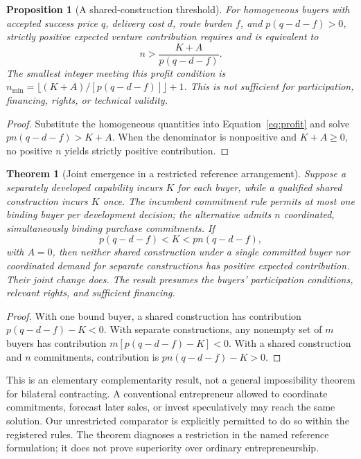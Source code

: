 \documentclass[11pt,letterpaper]{article}
\newtheorem{proposition}{Proposition}[section]
\newtheorem{theorem}{Theorem}[section]
\theoremstyle{remark}\newtheorem{remark}{Remark}[section]
\begin{document}
\begin{proposition}[A shared-construction threshold]\label{prop:threshold}
For homogeneous buyers with accepted success price $q$, delivery cost $d$, route burden $f$, and $p(q-d-f)>0$, strictly positive expected venture contribution requires and is equivalent to
\begin{equation}\label{eq:nmin}
n>\frac{K+A}{p(q-d-f)}.
\end{equation}
The smallest integer meeting this profit condition is
$n_{\min}=\lfloor(K+A)/[p(q-d-f)]\rfloor+1$.
This is not sufficient for participation, financing, rights, or technical validity.
\end{proposition}
\begin{proof}
Substitute the homogeneous quantities into Equation~\eqref{eq:profit} and solve $pn(q-d-f)>K+A$. When the denominator is nonpositive and $K+A\ge0$, no positive $n$ yields strictly positive contribution.
\end{proof}

\begin{theorem}[Joint emergence in a restricted reference arrangement]\label{thm:joint}
Suppose a separately developed capability incurs $K$ for each buyer, while a qualified shared construction incurs $K$ once. The incumbent commitment rule permits at most one binding buyer per development decision; the alternative admits $n$ coordinated, simultaneously binding purchase commitments. If
\begin{equation}\label{eq:joint}
p(q-d-f)<K<pn(q-d-f),
\end{equation}
with $A=0$, then neither shared construction under a single committed buyer nor coordinated demand for separate constructions has positive expected contribution. Their joint change does. The result presumes the buyers' participation conditions, relevant rights, and sufficient financing.
\end{theorem}
\begin{proof}
With one bound buyer, a shared construction has contribution $p(q-d-f)-K<0$. With separate constructions, any nonempty set of $m$ buyers has contribution $m[p(q-d-f)-K]<0$. With a shared construction and $n$ commitments, contribution is $pn(q-d-f)-K>0$.
\end{proof}

This is an elementary complementarity result, not a general impossibility theorem for bilateral contracting. A conventional entrepreneur allowed to coordinate commitments, forecast later sales, or invest speculatively may reach the same solution. Our unrestricted comparator is explicitly permitted to do so within the registered rules. The theorem diagnoses a restriction in the named reference formulation; it does not prove superiority over ordinary entrepreneurship.
\end{document}
